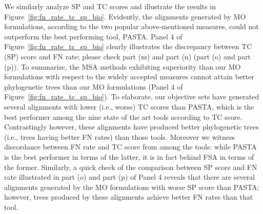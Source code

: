 We similarly analyze SP and TC scores and illustrate the results in Figure~\ref{fig:fn_rate_tc_sp_bio}. Evidently, the alignments generated by MO formulations, according to the two popular above-mentioned measures, could not outperform the best performing tool, PASTA.
Panel 4 of Figure~\ref{fig:fn_rate_tc_sp_bio} clearly illustrates the discrepancy between TC (SP) score and FN rate; please check part (m) and part (n) (part (o) and part (p)).
To summarize, the MSA methods exhibiting superiority than our MO formulations with respect to the widely accepted measures cannot attain better phylogenetic trees than our MO formulations (Panel 4 of Figure~\ref{fig:fn_rate_tc_sp_bio}). To elaborate, our objective sets have generated several alignments with lower (i.e., worse) TC scores than PASTA, which is the best performer among the nine state of the art tools according to TC score.  
Contrastingly however, these alignments have produced better phylogenetic trees (i.e., trees having better FN rates) than those tools. Moreover we witness discordance between FN rate and TC score from among the tools: while PASTA is the best performer in terms of the latter, it is in fact behind FSA in terms of the former. Similarly, a quick check of the comparison between SP score and FN rate illustrated in part (o) and part (p) of Panel 4 reveals that there are several alignments generated by the MO formulations with worse SP score than PASTA; however, trees produced by these alignments achieve better FN rates than that tool.   

